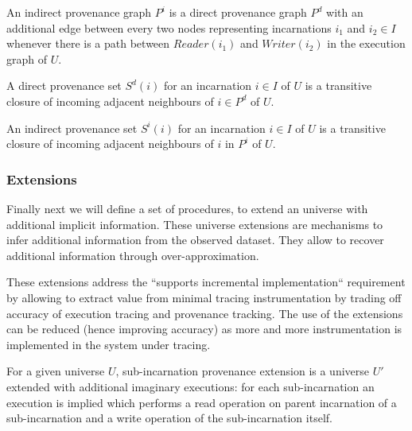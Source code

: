 \begin{definition}\label{def:indirect-prov-set}
An indirect provenance graph $P^{i}$ is a direct provenance graph $P^{d}$ with an additional edge between every two nodes representing incarnations $i_{1}$ and $i_{2} \in I$ whenever there is a path between $Reader(i_{1})$ and $Writer(i_{2})$ in the execution graph of $U$.
\end{definition}

\begin{definition}
A direct provenance set $S^{d}(i)$ for an incarnation $i \in I$ of $U$ is a transitive closure of incoming adjacent neighbours of $i \in P^{d}$ of $U$.
\end{definition}

\begin{definition}
An indirect provenance set $S^{i}(i)$ for an incarnation $i \in I$ of $U$ is a transitive closure of incoming adjacent neighbours of $i$ in $P^{i}$ of $U$.
\end{definition}

\subsubsection{Extensions}\label{sec:model-extensions}

Finally next we will define a set of procedures, to extend an universe with additional implicit information. These universe extensions are mechanisms to infer additional information from the observed dataset. They allow to recover additional information through over-approximation.

These extensions address the ``supports incremental implementation`` requirement by allowing to extract value from minimal tracing instrumentation by trading off accuracy of execution tracing and provenance tracking. The use of the extensions can be reduced (hence improving accuracy) as more and more instrumentation is implemented in the system under tracing.


\begin{definition} For a given universe $U$, sub-incarnation provenance extension is a universe $U'$ extended with additional imaginary executions: for each sub-incarnation an execution is implied which performs a read operation on parent incarnation of a sub-incarnation and a write operation of the sub-incarnation itself.
\end{definition}

